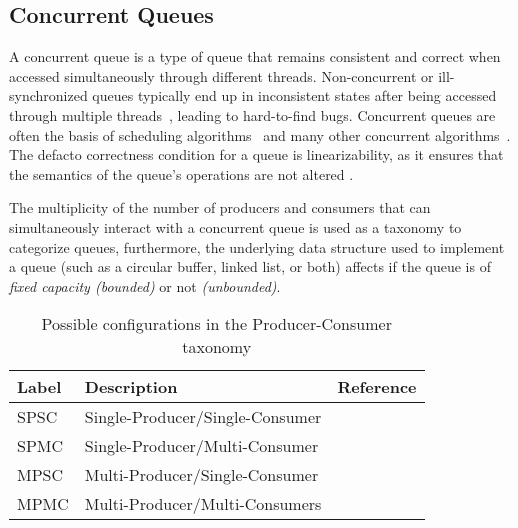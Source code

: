 \subsection{Concurrent Queues}
A concurrent queue is a type of queue that remains consistent and correct when
accessed simultaneously through different threads. Non-concurrent or
ill-synchronized queues typically end up in inconsistent states after being
accessed through multiple threads~\citep{yahav2003automatically}, leading
to hard-to-find bugs. Concurrent queues are often the basis of scheduling
algorithms~\citep{debattista2002high} and many other concurrent
algorithms~\citep{yahav2003automatically}. The defacto correctness condition
for a queue is linearizability, as it ensures that the semantics of the queue's
operations are not altered \citep{mellor1987concurrent, valois1995datastructures}.

The multiplicity of the number of producers and
consumers that can simultaneously interact with a concurrent queue is used as a
taxonomy to categorize queues, furthermore, the underlying
data structure used to implement a queue (such as a circular buffer,
linked list, or both) affects if the queue is of \emph{fixed capacity (bounded)} or not
\emph{(unbounded)}.

\begin{table*}[h]\centering
\caption{Possible configurations in the Producer-Consumer taxonomy}\label{tab:producer_consumer}
    \begin{tabular}{lll}
        \hline
        Label & Description & Reference \\ \hline
        SPSC & Single-Producer/Single-Consumer & \citep{aldinucci2012efficient} \\
        SPMC & Single-Producer/Multi-Consumer & \citep{arnautov2017ffq} \\
        MPSC & Multi-Producer/Single-Consumer & \\
        MPMC & Multi-Producer/Multi-Consumers & \citep{michael1996simple,valois1994queues,hoffman2007baskets}\\ \hline
    \end{tabular}        
\end{table*}



